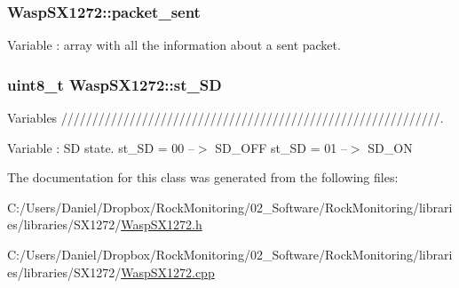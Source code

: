 \subsubsection[{\texorpdfstring{packet\+\_\+sent}{packet_sent}}]{ Wasp\+S\+X1272\+::packet\+\_\+sent}\hypertarget{class_wasp_s_x1272_aa318dbc9060a067fb925926cd3545366}{}\label{class_wasp_s_x1272_aa318dbc9060a067fb925926cd3545366}
Variable \+: array with all the information about a sent packet. 
\subsubsection[{\texorpdfstring{st\+\_\+\+SD}{st_SD}}]{\setlength{\rightskip}{0pt plus 5cm}uint8\+\_\+t Wasp\+S\+X1272\+::st\+\_\+\+SD}\hypertarget{class_wasp_s_x1272_a76dd3e69da36093d4e249998202b414e}{}\label{class_wasp_s_x1272_a76dd3e69da36093d4e249998202b414e}


Variables /////////////////////////////////////////////////////////////. 

Variable \+: SD state. st\+\_\+\+SD = 00 --$>$ S\+D\+\_\+\+O\+FF st\+\_\+\+SD = 01 --$>$ S\+D\+\_\+\+ON 

The documentation for this class was generated from the following files\+:\begin{DoxyCompactItemize}
\item 
C\+:/\+Users/\+Daniel/\+Dropbox/\+Rock\+Monitoring/02\+\_\+\+Software/\+Rock\+Monitoring/libraries/libraries/\+S\+X1272/\hyperlink{_wasp_s_x1272_8h}{Wasp\+S\+X1272.\+h}\item 
C\+:/\+Users/\+Daniel/\+Dropbox/\+Rock\+Monitoring/02\+\_\+\+Software/\+Rock\+Monitoring/libraries/libraries/\+S\+X1272/\hyperlink{_wasp_s_x1272_8cpp}{Wasp\+S\+X1272.\+cpp}\end{DoxyCompactItemize}
